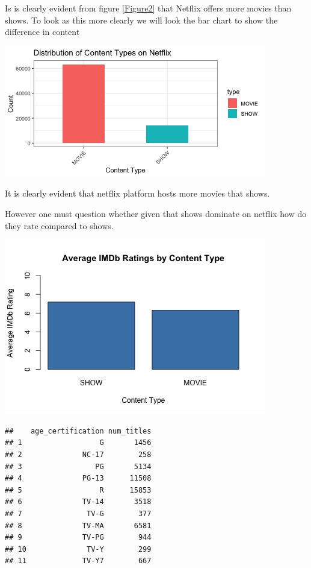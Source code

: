 \documentclass[12pt,preprint, authoryear]{elsarticle}
\let\origfigure\figure
\let\endorigfigure\endfigure
\renewenvironment{figure}[1][2] {
    \expandafter\origfigure\expandafter[H]
} {
    \endorigfigure
}
\numberwithin{equation}{section}
\numberwithin{figure}{section}
\numberwithin{table}{section}
\begin{document}
Is is clearly evident from figure \ref{Figure2} that Netflix offers more
movies than shows. To look as this more clearly we will look the bar
chart to show the difference in content

\begin{figure}[H]

{\centering \includegraphics{Q4_files/figure-latex/Figure3-1} 

}

\caption{Bar graph \label{Figure3}}\label{fig:Figure3}
\end{figure}

It is clearly evident that netflix platform hosts more movies that
shows.

However one must question whether given that shows dominate on netflix
how do they rate compared to shows.

\begin{figure}[H]

{\centering \includegraphics{Q4_files/figure-latex/Figure4-1} 

}

\caption{Average ratings  \label{Figure4}}\label{fig:Figure4}
\end{figure}

\begin{verbatim}
##    age_certification num_titles
## 1                  G       1456
## 2              NC-17        258
## 3                 PG       5134
## 4              PG-13      11508
## 5                  R      15853
## 6              TV-14       3518
## 7               TV-G        377
## 8              TV-MA       6581
## 9              TV-PG        944
## 10              TV-Y        299
## 11             TV-Y7        667
\end{verbatim}
\end{document}
